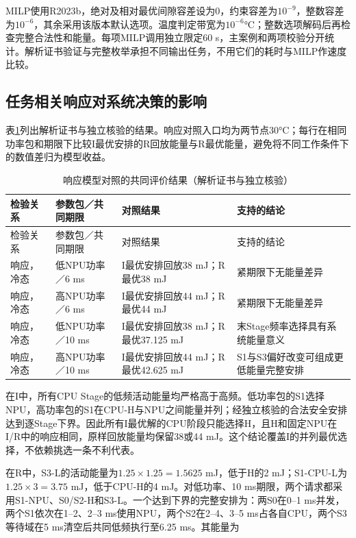 MILP使用R2023b，绝对及相对最优间隙容差设为0，约束容差为$10^{-9}$，整数容差为$10^{-6}$，其余采用该版本默认选项。温度判定带宽为$10^{-6}$°C；整数选项解码后再检查完整合法性和能量。每项MILP调用独立限定60 s，主案例和两项校验分开统计。解析证书验证与完整枚举承担不同输出任务，不用它们的耗时与MILP作速度比较。

\subsection{任务相关响应对系统决策的影响}


表\ref{tab:results}列出解析证书与独立核验的结果。响应对照入口均为两节点30°C；每行在相同功率包和期限下比较I最优安排的R回放能量与R最优能量，避免将不同工作条件下的数值差归为模型收益。

\begin{longtable}{@{}p{2.8cm}p{2.8cm}p{5.0cm}p{3.0cm}@{}}
\caption{响应模型对照的共同评价结果（解析证书与独立核验）}\label{tab:results}\\
\toprule
检验关系 & 参数包／共同期限 & 对照结果 & 支持的结论 \\
\midrule
\endfirsthead
\toprule
检验关系 & 参数包／共同期限 & 对照结果 & 支持的结论 \\
\midrule
\endhead
响应，冷态 & 低NPU功率／6 ms & I最优安排回放38 mJ；R最优38 mJ & 紧期限下无能量差异 \\
响应，冷态 & 高NPU功率／6 ms & I最优安排回放44 mJ；R最优44 mJ & 紧期限下无能量差异 \\
响应，冷态 & 低NPU功率／10 ms & I最优安排回放38 mJ；R最优37.125 mJ & 末Stage频率选择具有系统能量意义 \\
响应，冷态 & 高NPU功率／10 ms & I最优安排回放44 mJ；R最优42.625 mJ & S1与S3偏好改变可组成更低能量完整安排 \\
\bottomrule
\end{longtable}

在I中，所有CPU Stage的低频活动能量均严格高于高频。低功率包的S1选择NPU，高功率包的S1在CPU-H与NPU之间能量并列；经独立核验的合法安全安排达到逐Stage下界。因此所有I最优解的CPU阶段只能选择H，且H和固定NPU在I/R中的响应相同，原样回放能量均保留38或44 mJ。这个结论覆盖I的并列最优选择，不依赖挑选一条不利代表。

在R中，S3-L的活动能量为\(1.25\times1.25=1.5625\) mJ，低于H的2 mJ；S1-CPU-L为\(1.25\times3=3.75\) mJ，低于CPU-H的4 mJ。对低功率、10 ms期限，两个请求都采用S1-NPU、S0/S2-H和S3-L。一个达到下界的完整安排为：两S0在0--1 ms并发，两个S1依次在1--2、2--3 ms使用NPU，两个S2在2--4、3--5 ms占各自CPU，两个S3等待域在5 ms清空后共同低频执行至6.25 ms。其能量为

